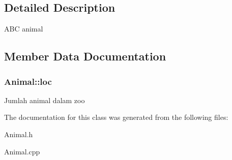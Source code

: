 \subsection{Detailed Description}
A\+BC animal 

\subsection{Member Data Documentation}
\subsubsection[{\texorpdfstring{loc}{loc}}]{ Animal\+::loc\hspace{0.3cm}{\ttfamily [protected]}}\hypertarget{classAnimal_a7f26dd7aa22ec6c003e0d564fb27baa3}{}\label{classAnimal_a7f26dd7aa22ec6c003e0d564fb27baa3}
Jumlah animal dalam zoo 

The documentation for this class was generated from the following files\+:\begin{DoxyCompactItemize}
\item 
Animal.\+h\item 
Animal.\+cpp\end{DoxyCompactItemize}
